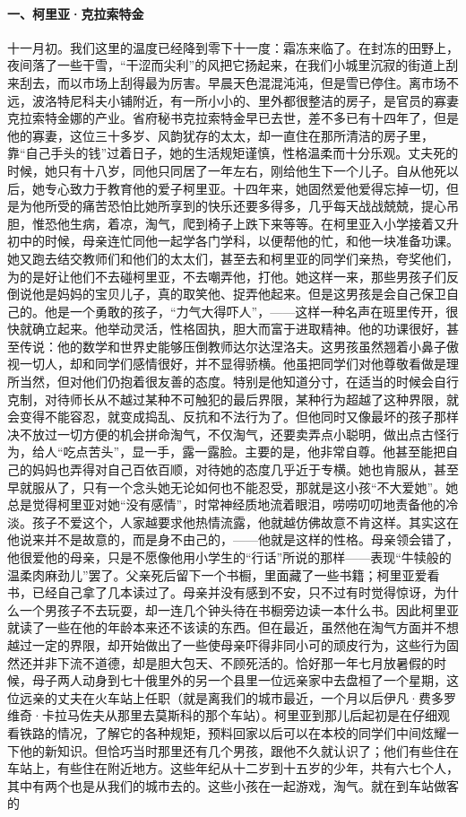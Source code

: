 \paragraph*{一、柯里亚·克拉索特金}
\par 十一月初。我们这里的温度已经降到零下十一度：霜冻来临了。在封冻的田野上，夜间落了一些干雪，“干涩而尖利”的风把它扬起来，在我们小城里沉寂的街道上刮来刮去，而以市场上刮得最为厉害。早晨天色混混沌沌，但是雪已停住。离市场不远，波洛特尼科夫小铺附近，有一所小小的、里外都很整洁的房子，是官员的寡妻克拉索特金娜的产业。省府秘书克拉索特金早已去世，差不多已有十四年了，但是他的寡妻，这位三十多岁、风韵犹存的太太，却一直住在那所清洁的房子里，靠“自己手头的钱”过着日子，她的生活规矩谨慎，性格温柔而十分乐观。丈夫死的时候，她只有十八岁，同他只同居了一年左右，刚给他生下一个儿子。自从他死以后，她专心致力于教育他的爱子柯里亚。十四年来，她固然爱他爱得忘掉一切，但是为他所受的痛苦恐怕比她所享到的快乐还要多得多，几乎每天战战兢兢，提心吊胆，惟恐他生病，着凉，淘气，爬到椅子上跌下来等等。在柯里亚入小学接着又升初中的时候，母亲连忙同他一起学各门学科，以便帮他的忙，和他一块准备功课。她又跑去结交教师们和他们的太太们，甚至去和柯里亚的同学们亲热，夸奖他们，为的是好让他们不去碰柯里亚，不去嘲弄他，打他。她这样一来，那些男孩子们反倒说他是妈妈的宝贝儿子，真的取笑他、捉弄他起来。但是这男孩是会自己保卫自己的。他是一个勇敢的孩子，“力气大得吓人”，——这样一种名声在班里传开，很快就确立起来。他举动灵活，性格固执，胆大而富于进取精神。他的功课很好，甚至传说：他的数学和世界史能够压倒教师达尔达涅洛夫。这男孩虽然翘着小鼻子傲视一切人，却和同学们感情很好，并不显得骄横。他虽把同学们对他尊敬看做是理所当然，但对他们仍抱着很友善的态度。特别是他知道分寸，在适当的时候会自行克制，对待师长从不越过某种不可触犯的最后界限，某种行为超越了这种界限，就会变得不能容忍，就变成捣乱、反抗和不法行为了。但他同时又像最坏的孩子那样决不放过一切方便的机会拼命淘气，不仅淘气，还要卖弄点小聪明，做出点古怪行为，给人“吃点苦头”，显一手，露一露脸。主要的是，他非常自尊。他甚至能把自己的妈妈也弄得对自己百依百顺，对待她的态度几乎近于专横。她也肯服从，甚至早就服从了，只有一个念头她无论如何也不能忍受，那就是这小孩“不大爱她”。她总是觉得柯里亚对她“没有感情”，时常神经质地流着眼泪，唠唠叨叨地责备他的冷淡。孩子不爱这个，人家越要求他热情流露，他就越仿佛故意不肯这样。其实这在他说来并不是故意的，而是身不由己的，——他就是这样的性格。母亲领会错了，他很爱他的母亲，只是不愿像他用小学生的“行话”所说的那样——表现“牛犊般的温柔肉麻劲儿”罢了。父亲死后留下一个书橱，里面藏了一些书籍；柯里亚爱看书，已经自己拿了几本读过了。母亲并没有感到不安，只不过有时觉得惊讶，为什么一个男孩子不去玩耍，却一连几个钟头待在书橱旁边读一本什么书。因此柯里亚就读了一些在他的年龄本来还不该读的东西。但在最近，虽然他在淘气方面并不想越过一定的界限，却开始做出了一些使母亲吓得非同小可的顽皮行为，这些行为固然还并非下流不道德，却是胆大包天、不顾死活的。恰好那一年七月放暑假的时候，母子两人动身到七十俄里外的另一个县里一位远亲家中去盘桓了一个星期，这位远亲的丈夫在火车站上任职（就是离我们的城市最近，一个月以后伊凡·费多罗维奇·卡拉马佐夫从那里去莫斯科的那个车站）。柯里亚到那儿后起初是在仔细观看铁路的情况，了解它的各种规矩，预料回家以后可以在本校的同学们中间炫耀一下他的新知识。但恰巧当时那里还有几个男孩，跟他不久就认识了；他们有些住在车站上，有些住在附近地方。这些年纪从十二岁到十五岁的少年，共有六七个人，其中有两个也是从我们的城市去的。这些小孩在一起游戏，淘气。就在到车站做客的